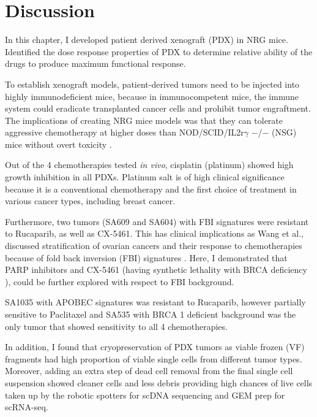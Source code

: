 \section{Discussion}


 In this chapter, I developed patient derived xenograft (PDX) in NRG mice.  Identified the dose response properties of PDX to determine relative ability of the drugs to produce maximum functional response. 

  To establish xenograft models, patient-derived tumors need to be injected into highly immunodeficient mice, because in immunocompetent mice, the immune system could eradicate transplanted cancer cells and prohibit tumor engraftment. The implications of creating \ac{NRG} mice models was that they can tolerate aggressive chemotherapy at higher doses than NOD/SCID/IL2r$\gamma$ $-$/$-$ (NSG) mice without overt toxicity \cite{barve2018comparative}. 


 Out of the 4 chemotherapies tested \textit{in vivo}, cisplatin (platinum) showed high growth inhibition in all PDXs. Platinum salt is of high clinical significance because it is a conventional chemotherapy and the first choice of treatment in various cancer types, including breast cancer.
 
 Furthermore, two tumors (SA609 and SA604) with FBI signatures were resistant to Rucaparib, as well as CX-5461. This has clinical implications as Wang et al., discussed stratification of ovarian cancers and their response to chemotherapies because of fold back inversion (FBI) signatures  \cite{wang2017genomic}. Here, I demonstrated that PARP inhibitors and CX-5461 (having synthetic lethality with BRCA deficiency \cite{xu2017cx}), could be further explored with respect to FBI background.

SA1035 with APOBEC signatures was resistant to Rucaparib, however partially sensitive to Paclitaxel and SA535 with BRCA 1 deficient background was the only tumor that showed sensitivity to all 4 chemotherapies.
 

 In addition, I found that cryopreservation of PDX tumors as viable frozen (VF) fragments had high proportion of viable single cells from different tumor types. Moreover, adding an extra step of dead cell removal from the final single cell suspension showed cleaner cells and less debris providing high chances of live cells taken up by the robotic spotters for scDNA sequencing and GEM prep for scRNA-seq.

